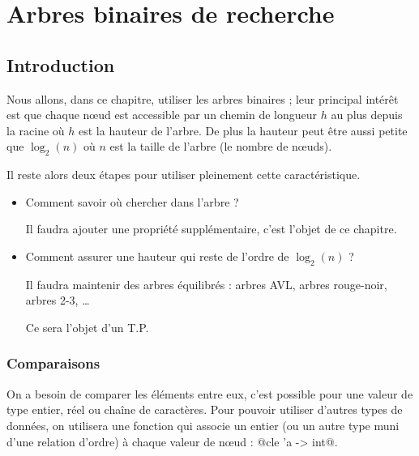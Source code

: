 \chapter{Arbres binaires de recherche}
\section{Introduction}

Nous allons, dans ce chapitre, utiliser les arbres binaires ; leur principal intérêt est que chaque nœud est accessible par un chemin de longueur $h$ au plus depuis la racine  où $h$ est la hauteur de l'arbre. De plus la hauteur peut être aussi petite que $\log_2(n)$ où $n$ est la taille de l'arbre (le nombre de nœuds).

\medskip

Il reste alors deux étapes pour utiliser pleinement cette caractéristique.
\begin{itemize}
\item Comment savoir où chercher dans l'arbre ?

Il faudra ajouter une propriété supplémentaire, c'est l'objet de ce chapitre.

\item Comment assurer une hauteur qui reste de l'ordre de $\log_2(n)$ ?

Il faudra maintenir des arbres équilibrés : arbres AVL, arbres rouge-noir, arbres 2-3, \dots

Ce sera l'objet d'un T.P.
\end{itemize}
\subsection{Comparaisons}
On a besoin de comparer les éléments entre eux, c'est possible pour une valeur de type entier, réel ou chaîne de caractères. Pour pouvoir utiliser d'autres types de données, on utilisera une fonction  qui associe un entier (ou un autre type muni d'une relation d'ordre) à chaque valeur de nœud : @cle 'a  -> int@.


